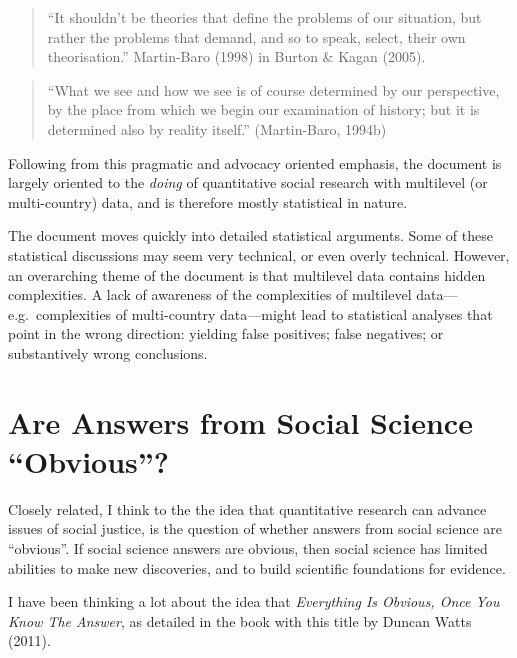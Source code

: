 \documentclass[
  letterpaper,
  DIV=11,
  numbers=noendperiod]{scrreprt}
\begin{document}
\begin{quote}
``It shouldn't be theories that define the problems of our situation,
but rather the problems that demand, and so to speak, select, their own
theorisation.'' Martin-Baro (1998) in Burton \& Kagan (2005).
\end{quote}

\begin{quote}
``What we see and how we see is of course determined by our perspective,
by the place from which we begin our examination of history; but it is
determined also by reality itself.'' (Martin-Baro, 1994b)
\end{quote}

Following from this pragmatic and advocacy oriented emphasis, the
document is largely oriented to the \emph{doing} of quantitative social
research with multilevel (or multi-country) data, and is therefore
mostly statistical in nature.

The document moves quickly into detailed statistical arguments. Some of
these statistical discussions may seem very technical, or even overly
technical. However, an overarching theme of the document is that
multilevel data contains hidden complexities. A lack of awareness of the
complexities of multilevel data---e.g.~complexities of multi-country
data---might lead to statistical analyses that point in the wrong
direction: yielding false positives; false negatives; or substantively
wrong conclusions.

\hypertarget{are-answers-from-social-science-obvious}{%
\section{Are Answers from Social Science
``Obvious''?}\label{are-answers-from-social-science-obvious}}

Closely related, I think to the the idea that quantitative research can
advance issues of social justice, is the question of whether answers
from social science are ``obvious''. If social science answers are
obvious, then social science has limited abilities to make new
discoveries, and to build scientific foundations for evidence.

I have been thinking a lot about the idea that \emph{Everything Is
Obvious, Once You Know The Answer}, as detailed in the book with this
title by Duncan Watts (2011).
\end{document}
